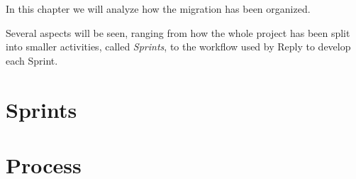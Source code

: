 In this chapter we will analyze how the migration has been organized.

Several aspects will be seen, ranging from how the whole project has been split into smaller activities, called \textit{Sprints}, to the workflow used by Reply to develop each Sprint.

\section{Sprints}
    
\section{Process}
    
